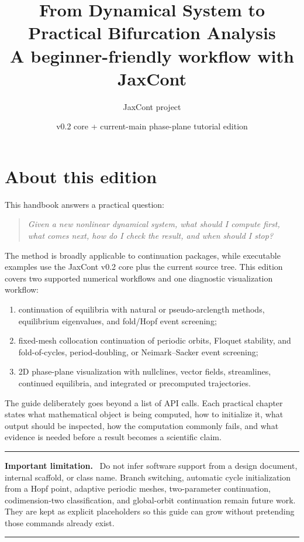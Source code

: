 \documentclass[11pt,oneside]{book}
\title{\Huge From Dynamical System to\\[2mm]Practical Bifurcation Analysis\\[7mm]
       \Large A beginner-friendly workflow with JaxCont}
\author{JaxCont project}
\date{v0.2 core + current-main phase-plane tutorial edition}
\newenvironment{warningbox}
  {\par\medskip\noindent\begin{minipage}{\textwidth}
   \color{JaxRed}\rule{\textwidth}{0.8pt}\par
   \textbf{Important limitation.}\ \color{black}}
  {\par\color{JaxRed}\rule{\textwidth}{0.8pt}
   \end{minipage}\par\medskip}
\begin{document}
\frontmatter
\maketitle
\clearpage
\setcounter{page}{2}

\chapter*{About this edition}

This handbook answers a practical question:

\begin{quote}
\emph{Given a new nonlinear dynamical system, what should I compute first,
what comes next, how do I check the result, and when should I stop?}
\end{quote}

The method is broadly applicable to continuation packages, while executable
examples use the JaxCont v0.2 core plus the current source tree. This edition
covers two supported numerical workflows and one diagnostic visualization
workflow:

\begin{enumerate}
  \item continuation of equilibria with natural or pseudo-arclength methods,
        equilibrium eigenvalues, and fold/Hopf event screening;
  \item fixed-mesh collocation continuation of periodic orbits, Floquet
        stability, and fold-of-cycles, period-doubling, or Neimark--Sacker
        event screening;
  \item 2D phase-plane visualization with nullclines, vector fields,
        streamlines, continued equilibria, and integrated or precomputed
        trajectories.
\end{enumerate}

The guide deliberately goes beyond a list of API calls. Each practical chapter
states what mathematical object is being computed, how to initialize it, what
output should be inspected, how the computation commonly fails, and what
evidence is needed before a result becomes a scientific claim.

\begin{warningbox}
Do not infer software support from a design document, internal scaffold, or
class name. Branch switching, automatic cycle initialization from a Hopf point,
adaptive periodic meshes, two-parameter continuation, codimension-two
classification, and global-orbit continuation remain future work. They are
kept as explicit placeholders so this guide can grow without pretending those
commands already exist.
\end{warningbox}
\end{document}
